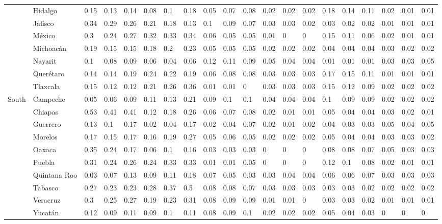 \documentclass[11.5pt]{article}
\begin{document}
{\begin{landscape}
\begin{table}[ht]
\begin{footnotesize}
\begin{tabular}{lllll|lll|lll|lll|lll|lll}
   & Hidalgo & 0.15 & 0.13 & 0.14 & 0.08 & 0.1 & 0.18 & 0.05 & 0.07 & 0.08 & 0.02 & 0.02 & 0.02 & 0.18 & 0.14 & 0.11 & 0.02 & 0.01 & 0.01 \\ 
   & Jalisco & 0.34 & 0.29 & 0.26 & 0.21 & 0.18 & 0.13 & 0.1 & 0.09 & 0.07 & 0.03 & 0.03 & 0.02 & 0.03 & 0.02 & 0.02 & 0.01 & 0.01 & 0.01 \\ 
   & M\'exico & 0.3 & 0.24 & 0.27 & 0.32 & 0.33 & 0.34 & 0.06 & 0.05 & 0.05 & 0.01 & 0 & 0 & 0.15 & 0.11 & 0.06 & 0.02 & 0.01 & 0.01 \\ 
   & Michoac\'an & 0.19 & 0.15 & 0.15 & 0.18 & 0.2 & 0.23 & 0.05 & 0.05 & 0.05 & 0.02 & 0.02 & 0.02 & 0.04 & 0.04 & 0.04 & 0.03 & 0.02 & 0.02 \\ 
   & Nayarit & 0.1 & 0.08 & 0.09 & 0.06 & 0.04 & 0.06 & 0.12 & 0.11 & 0.09 & 0.05 & 0.04 & 0.04 & 0.01 & 0.01 & 0.01 & 0.03 & 0.03 & 0.05 \\ 
   & Quer\'etaro & 0.14 & 0.14 & 0.19 & 0.24 & 0.22 & 0.19 & 0.06 & 0.08 & 0.08 & 0.03 & 0.03 & 0.03 & 0.17 & 0.15 & 0.11 & 0.01 & 0.01 & 0.01 \\ 
   & Tlaxcala & 0.15 & 0.12 & 0.12 & 0.21 & 0.26 & 0.36 & 0.01 & 0.01 & 0 & 0.03 & 0.03 & 0.03 & 0.15 & 0.12 & 0.09 & 0.02 & 0.02 & 0.02 \\ 
  South & Campeche & 0.05 & 0.06 & 0.09 & 0.11 & 0.13 & 0.21 & 0.09 & 0.1 & 0.1 & 0.04 & 0.04 & 0.04 & 0.1 & 0.09 & 0.09 & 0.02 & 0.02 & 0.02 \\ 
   & Chiapas & 0.53 & 0.41 & 0.41 & 0.12 & 0.18 & 0.26 & 0.06 & 0.07 & 0.08 & 0.02 & 0.01 & 0.01 & 0.05 & 0.04 & 0.04 & 0.03 & 0.02 & 0.01 \\ 
   & Guerrero & 0.13 & 0.1 & 0.17 & 0.02 & 0.04 & 0.17 & 0.02 & 0.04 & 0.07 & 0.02 & 0.01 & 0.02 & 0.04 & 0.03 & 0.03 & 0.05 & 0.04 & 0.05 \\ 
   & Morelos & 0.17 & 0.15 & 0.17 & 0.16 & 0.19 & 0.27 & 0.05 & 0.06 & 0.05 & 0.02 & 0.02 & 0.02 & 0.05 & 0.04 & 0.04 & 0.03 & 0.03 & 0.02 \\ 
   & Oaxaca & 0.35 & 0.24 & 0.17 & 0.06 & 0.1 & 0.16 & 0.03 & 0.03 & 0.03 & 0 & 0 & 0 & 0.08 & 0.08 & 0.07 & 0.05 & 0.03 & 0.03 \\ 
   & Puebla & 0.31 & 0.24 & 0.26 & 0.24 & 0.33 & 0.33 & 0.01 & 0.01 & 0.05 & 0 & 0 & 0 & 0.12 & 0.1 & 0.08 & 0.02 & 0.01 & 0.01 \\ 
   & Quintana Roo & 0.03 & 0.07 & 0.13 & 0.09 & 0.11 & 0.18 & 0.07 & 0.05 & 0.03 & 0.03 & 0.04 & 0.04 & 0.06 & 0.06 & 0.07 & 0.03 & 0.03 & 0.03 \\ 
   & Tabasco & 0.27 & 0.23 & 0.23 & 0.28 & 0.37 & 0.5 & 0.08 & 0.08 & 0.07 & 0.03 & 0.03 & 0.03 & 0.03 & 0.03 & 0.02 & 0.02 & 0.02 & 0.02 \\ 
   & Veracruz & 0.3 & 0.25 & 0.27 & 0.19 & 0.23 & 0.31 & 0.08 & 0.09 & 0.09 & 0.01 & 0.01 & 0 & 0.03 & 0.03 & 0.02 & 0.01 & 0.01 & 0.01 \\ 
   & Yucat\'an & 0.12 & 0.09 & 0.11 & 0.09 & 0.1 & 0.11 & 0.08 & 0.09 & 0.1 & 0.02 & 0.02 & 0.02 & 0.05 & 0.04 & 0.03 & 0 & 0 & 0 \\ 
  

\end{tabular}
\end{footnotesize}
\end{table}
\end{landscape}}
\end{document}
